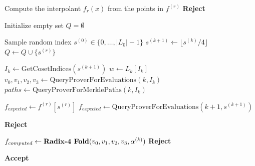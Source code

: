 \documentclass[11pt,runningheads]{llncs}
\begin{document}
\begin{algorithm}[H]
    \caption{FRI Query Phase and Round Consistency Check ($\eta=2$)}
    \label{alg:fri_verify}
    \SetAlgoLined
    { \scriptsize
    
    Compute the interpolant $f_r(x)$ from the points in $f^{(r)}$\;
    {
        \Return \textbf{Reject}\;
    }

    Initialize empty set $Q = \emptyset$ 

    {
        {
            Sample random index $s^{(0)} \in \{0, \dots, |L_0|-1\}$\;
            {
                $s^{(k+1)} \gets \lfloor s^{(k)} / 4 \rfloor$\;
            }
        }
        $Q \gets Q \cup \{s^{(r)}\}$\;
        
        {
            $I_k \gets \text{GetCosetIndices}(s^{(k+1)})$ 
            $w \gets L_k[I_k]$\;
            $v_0, v_1, v_2, v_3 \gets \text{QueryProverForEvaluations}(k, I_k)$\;
            $paths \gets \text{QueryProverForMerklePaths}(k, I_k)$\;
            
            {
                $f_{expected} \gets f^{(r)}[s^{(r)}]$\;
            }
            {
                $f_{expected} \gets \text{QueryProverForEvaluations}(k+1, s^{(k+1)})$\;
            }
            
            {
                \Return \textbf{Reject}\;
            }
            
            $f_{computed} \gets \text{\textbf{Radix-4 Fold}}(v_0,v_1,v_2,v_3,\alpha^{(k)})$\;
            {
                \Return \textbf{Reject}\;
            }
        }
    }
    \Return \textbf{Accept}\;
    }
\end{algorithm}
\end{document}
